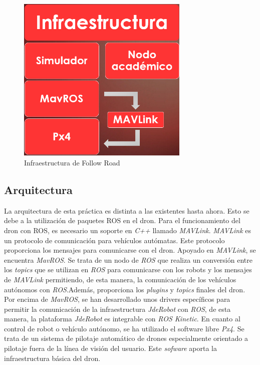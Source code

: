 \begin{figure}[H]
  \begin{center}
    \includegraphics[width=0.4\linewidth, height=8cm]{figures/infraestructura_fr.png}
		\caption{Infraestructura de Follow Road}
		\label{fig.infraestructura_fr}
		\end{center}
\end{figure}

\subsection{Arquitectura}
La arquitectura de esta práctica es distinta a las existentes hasta ahora. Esto se debe a la utilización de paquetes ROS en el dron. Para el funcionamiento del dron con ROS, es necesario un soporte en \textit{C++} llamado \textit{MAVLink}. \textit{MAVLink} es un protocolo de comunicación para vehículos autómatas. Este protocolo proporciona los mensajes para comunicarse con el dron. Apoyado en \textit{MAVLink}, se encuentra \textit{MavROS}. Se trata de un nodo de \textit{ROS} que realiza un conversión entre los \textit{topics} que se utilizan en \textit{ROS} para comunicarse con los robots y los mensajes de \textit{MAVLink} permitiendo, de esta manera, la comunicación de los vehículos autónomos con \textit{ROS}.Además, proporciona los \textit{plugins} y \textit{topics} finales del dron. Por encima de \textit{MavROS}, se han desarrollado unos drivers específicos para permitir la comunicación de la infraestructura \textit{JdeRobot} con \textit{ROS}, de esta manera, la plataforma \textit{JdeRobot} es integrable con \textit{ROS Kinetic}.
En cuanto al control de robot o vehículo autónomo, se ha utilizado el software libre \textit{Px4}. Se trata de un sistema de pilotaje automático de drones especialmente orientado a pilotaje fuera de la línea de visión del usuario. Este \textit{sofware} aporta la infraestructura básica del dron.


